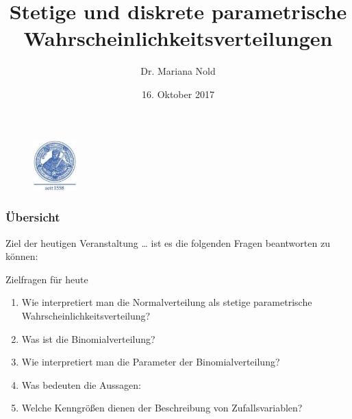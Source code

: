 \documentclass[usenames,dvipsnames,handout]{beamer}
\begin{document}
\author[Dr. Mariana Nold]{Dr. Mariana Nold}
 \date{}
\title [Verhalten von Zufallsvariablen]{Stetige und diskrete 
parametrische  Wahrscheinlichkeitsverteilungen}
\date{16. Oktober 2017}
\begin{frame}
\maketitle

  \begin{figure}[ht]
 	\centering
 	      \includegraphics[width=0.15\textwidth]{index.jpeg}
 	\end{figure}
\end{frame} 

\begin{frame}
  \frametitle{Übersicht}
  \tableofcontents
\end{frame}



\begin{frame}{Ziel der heutigen Veranstaltung \dots}
ist es die folgenden Fragen beantworten zu können:
\begin{block}{Zielfragen für heute}
\begin{enumerate}
\item{Wie interpretiert man die Normalverteilung als stetige
parametrische Wahrscheinlichkeitsverteilung?}
\item{Was ist die Binomialverteilung?}
\item{Wie interpretiert man die Parameter der Binomialverteilung?}
\item{Was bedeuten die Aussagen:}
\item{Welche Kenngrößen dienen der Beschreibung von Zufallsvariablen?}
\end{enumerate}
\end{block}
\end{frame}
\end{document}
